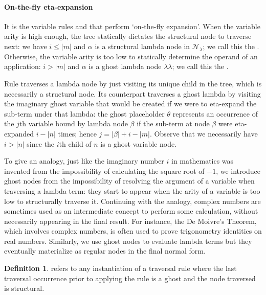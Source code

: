 \documentclass{elsarticle}
\theoremstyle{plain}
\theoremstyle{definition}
\newtheorem{definition}{Definition}[section]
\newcommand\Nodes{\mathcal{N}}%
\newcommand\NodesLmd{\Nodes_\lambda}%
\newcommand{\ghostlmd}{{\lambda\!\!\lambda}}
\newcommand{\ghostvar}{\theta}
\begin{document}
\paragraph{On-the-fly eta-expansion}
It is the variable rules  and  that perform `on-the-fly expansion'. When the variable arity is high enough, the tree statically dictates the structural node to traverse next: we have $i \leq |m|$ and $\alpha$ is a structural lambda node in $\NodesLmd$; we call this the . Otherwise, the variable arity is too low to statically determine the operand of an application: $i > |m|$ and $\alpha$ is a ghost lambda node $\ghostlmd$; we call this the .

Rule  traverses a lambda node by just visiting its unique child  in the tree, which is necessarily a structural node. Its counterpart \rulenamet{Lam^\ghostvar} traverses a ghost lambda by visiting the imaginary ghost variable that would be created if we were to eta-expand the sub-term under that lambda: the ghost placeholder $\ghostvar$ represents an occurrence of the $j$th variable bound by lambda node $\beta$ if the sub-term at node $\beta$ were eta-expanded $i-|n|$ times; hence $j = |\beta| + i - |m|$.
Observe that we necessarily have $i>|n|$ since the $i$th child of $n$ is a ghost variable node.

To give an analogy, just like the imaginary number $i$ in mathematics was invented from the impossibility of calculating the square root of $-1$, we introduce ghost nodes from the impossibility of resolving the argument of a variable when traversing a lambda term: they start to appear when the arity of a variable is too low to structurally traverse it.
Continuing with the analogy, complex numbers are sometimes used as an intermediate concept to perform some calculation, without necessarily appearing in the final result. For instance, the De Moivre's Theorem, which involves complex numbers, is often used to prove trigonometry identities on real numbers. Similarly, we use ghost nodes to evaluate lambda terms but they eventually materialize as regular nodes in the final normal form.

\begin{definition}
 refers to any instantiation of a traversal rule where the last traversal occurrence prior to applying the rule is a ghost
and the node traversed is structural.
\end{definition}
\end{document}
